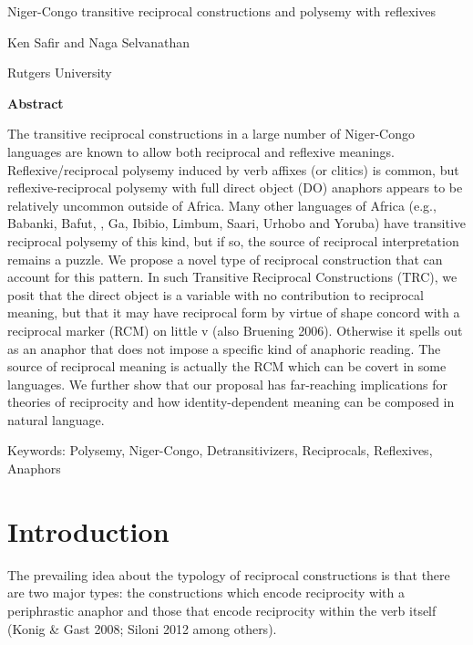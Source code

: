 

\setcounter{page}{1}\begin{styleHeading}
Niger-Congo transitive reciprocal constructions and polysemy with reflexives
\end{styleHeading}

Ken Safir and Naga Selvanathan

Rutgers University 

\bfseries
Abstract

\begin{stylelsAbstract}
The transitive reciprocal constructions in a large number of Niger-Congo languages are known to allow both reciprocal and reflexive meanings. Reflexive/reciprocal polysemy induced by verb affixes (or clitics) is common, but reflexive-reciprocal polysemy with full direct object (DO) anaphors appears to be relatively uncommon outside of Africa. Many other languages of Africa (e.g., Babanki, Bafut, , Ga, Ibibio, Limbum, Saari, Urhobo and Yoruba) have transitive reciprocal polysemy of this kind, but if so, the source of reciprocal interpretation remains a puzzle. We propose a novel type of reciprocal construction that can account for this pattern. In such Transitive Reciprocal Constructions (TRC), we posit that the direct object is a variable with no contribution to reciprocal meaning, but that it may have reciprocal form by virtue of shape concord with a reciprocal marker (RCM) on little v (also Bruening 2006). Otherwise it spells out as an anaphor that does not impose a specific kind of anaphoric reading. The source of reciprocal meaning is actually the RCM which can be covert in some languages. We further show that our proposal has far-reaching implications for theories of reciprocity and how identity-dependent meaning can be composed in natural language. 
\end{stylelsAbstract}

Keywords: Polysemy, Niger-Congo, Detransitivizers, Reciprocals, Reflexives, Anaphors

\chapter{Introduction}

\textbf{  }The prevailing idea about the typology of reciprocal constructions is that there are two major types: the constructions which encode reciprocity with a periphrastic anaphor and those that encode reciprocity within the verb itself (Konig \& Gast 2008; Siloni 2012 among others).

